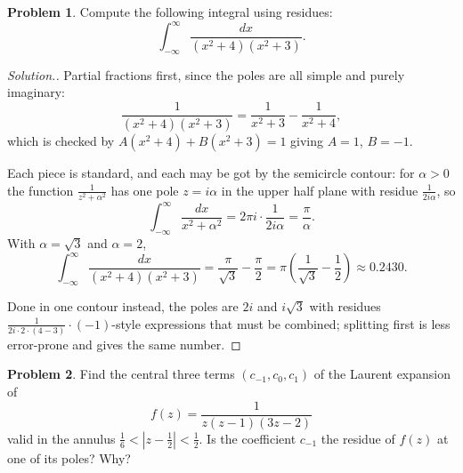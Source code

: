 \documentclass[11pt,a4paper]{article}
\theoremstyle{definition}
\newtheorem{problemx}{Problem}[section]
\newenvironment{problem}{\begin{problemx}}{\end{problemx}}
\newenvironment{solution}
  {\renewcommand{\qedsymbol}{}\begin{proof}[\textit{Solution}.]}
  {\end{proof}}
\begin{document}
\begin{problem}
Compute the following integral using residues:
$$\int^{\infty}_{-\infty}\frac{dx}{(x^{2} + 4)(x^{2} + 3)} .$$
\end{problem}

\begin{solution}
Partial fractions first, since the poles are all simple and purely imaginary:
$$\frac{1}{(x^{2}+4)(x^{2}+3)}
= \frac{1}{x^{2}+3} - \frac{1}{x^{2}+4},$$
which is checked by $A(x^{2}+4) + B(x^{2}+3) = 1$ giving $A = 1$, $B = -1$.

Each piece is standard, and each may be got by the semicircle contour: for
$\alpha > 0$ the function $\frac{1}{z^{2}+\alpha^{2}}$ has one pole
$z = i\alpha$ in the upper half plane with residue $\frac{1}{2i\alpha}$, so
$$\int^{\infty}_{-\infty}\frac{dx}{x^{2}+\alpha^{2}}
= 2\pi i\cdot\frac{1}{2i\alpha} = \frac{\pi}{\alpha}.$$
With $\alpha = \sqrt3$ and $\alpha = 2$,
$$\boxed{\int^{\infty}_{-\infty}\frac{dx}{(x^{2}+4)(x^{2}+3)}
= \frac{\pi}{\sqrt3} - \frac{\pi}{2}
= \pi\left(\frac{1}{\sqrt3}-\frac12\right) \approx 0.2430 .}$$

Done in one contour instead, the poles are $2i$ and $i\sqrt3$ with residues
$\frac{1}{2i\cdot 2\cdot(4-3)}\cdot(-1)$-style expressions that must be combined;
splitting first is less error-prone and gives the same number.
\end{solution}


\begin{problem}
Find the central three terms $(c_{-1}, c_0, c_1)$ of the Laurent expansion of
$$f(z) = \frac{1}{z(z-1)(3z-2)}$$
valid in the annulus
$\tfrac{1}{6} < \left|z - \tfrac{1}{2}\right| < \tfrac{1}{2}$. Is the coefficient
$c_{-1}$ the residue of $f(z)$ at one of its poles? Why?
\end{problem}
\end{document}
